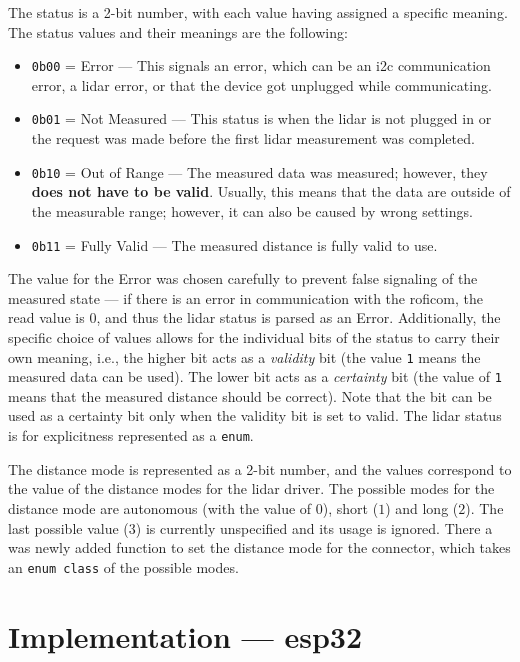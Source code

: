 \documentclass[
  digital,     %
  oneside,     %
  nosansbold,  %
  nocolorbold, %
  nolof,         %
  nolot,         %
]{fithesis4}
\newcommand{\TODO}[1]{\textcolor{red}{\textit{#1}}}
\newcommand{\TODOLIST}[1]{}
\begin{document}
{{{The status is a 2-bit number, with each value having assigned a specific meaning. The status values and their meanings are the following:
\begin{itemize}
    \item \lstinline|0b00| = Error --- This signals an error, which can be an \acrshort{i2c} communication error, a \acrshort{lidar} error, or that the device got unplugged while communicating.  
    \item \lstinline|0b01| = Not Measured --- This status is when the \acrshort{lidar} is not plugged in or the request was made before the first \acrshort{lidar} measurement was completed.
    \item \lstinline|0b10| = Out of Range --- The measured data was measured; however, they \textbf{does not have to be valid}. Usually, this means that the data are outside of the measurable range; however, it can also be caused by wrong settings.
    \item \lstinline|0b11| = Fully Valid --- The measured distance is fully valid to use.
\end{itemize}

The value for the Error was chosen carefully to prevent false signaling of the measured state --- if there is an error in communication with the \acrshort{roficom}, the read value is $0$, and thus the \acrshort{lidar} status is parsed as an Error. Additionally, the specific choice of values allows for the individual bits of the status to carry their own meaning, i.e., the higher bit acts as a \emph{validity} bit (the value \verb|1| means the measured data can be used). The lower bit acts as a \emph{certainty} bit (the value of \verb|1| means that the measured distance should be correct). Note that the bit can be used as a certainty bit only when the validity bit is set to valid. The \acrshort{lidar} status is for explicitness represented as a \lstinline|enum|.

The distance mode is represented as a 2-bit number, and the values correspond to the value of the distance modes for the \acrshort{lidar} driver. The possible modes for the distance mode are autonomous (with the value of $0$), short ($1$) and long ($2$). The last possible value ($3$) is currently unspecified and its usage is ignored. There a was newly added function to set the distance mode for the connector, which takes an \lstinline|enum class| of the possible modes.

\section{ Implementation --- esp32 }
\TODOLIST{
\begin{itemize}
    \item Apply changes from interface --- lidar status, distance and \TODO{distance modes}
    \item Issue $\rightarrow$ status is not being updated $\rightarrow$ Needed to implement poller
\end{itemize}
}

}}}
\end{document}
